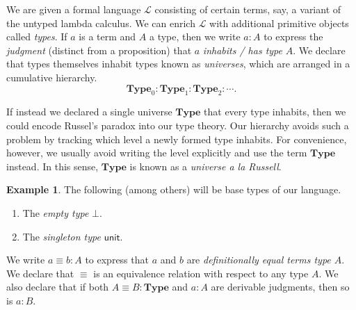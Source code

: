 \documentclass[10pt,letterpaper,cm]{nupset}
\theoremstyle{definition}
\newtheorem{exmp}[definition]{Example}
\theoremstyle{theorem}
\theoremstyle{remark}
\newcommand{\1}{\mathbf{1}}
\newcommand{\0}{\vec 0}
\begin{document}
We are given a formal language $\mathcal{L}$ consisting of certain terms, say, a variant of the untyped lambda calculus. We can enrich $\mathcal{L}$ with additional primitive objects called \textit{types}. If $a$ is a term and $A$ a type, then we write $a: A$ to express the \textit{judgment} (distinct from a proposition) that $a$ \textit{inhabits / has type} $A$. We declare that types themselves inhabit types known as \textit{universes}, which are arranged in a cumulative hierarchy. $$\mathbf{Type}_0 :\mathbf{Type}_1 : \mathbf{Type}_2 : \cdots . $$ 

If instead we declared a single universe $\mathbf{Type}$ that every type inhabits, then we could encode Russel's paradox into our type theory. Our hierarchy avoids such a problem by tracking which level a newly formed type inhabits. For convenience, however, we usually avoid writing the level explicitly and use the term $\mathbf{Type}$ instead. In this sense, $\mathbf{Type}$ is known as a \textit{universe a la Russell}.
\begin{exmp} The following (among others) will be base types of our language.
\begin{enumerate}
\item The \textit{empty type} $\bot$.
\item The \textit{singleton type} $\mathsf{unit}$.
\end{enumerate}
\end{exmp}
We write $a\equiv b :A$ to express that $a$ and $b$ are \textit{definitionally equal terms type $A$}. We declare that $\equiv$ is an equivalence relation with respect to any type $A$. We also declare that if both $A\equiv B : \mathbf{Type}$ and $a: A$ are derivable judgments, then so is $a:B$.
\end{document}
